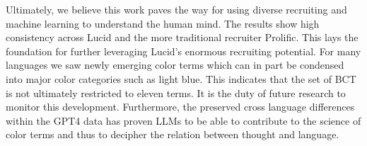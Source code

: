 Ultimately, we believe this work paves the way for using diverse recruiting and machine learning to understand the human mind.
The results show high consistency across Lucid and the more traditional recruiter Prolific.
This lays the foundation for further leveraging Lucid's enormous recruiting potential.
For many languages we saw newly emerging color terms which can in part be condensed into major color categories such as light blue.
This indicates that the set of BCT is not ultimately restricted to eleven terms.
It is the duty of future research to monitor this development.
Furthermore, the preserved cross language differences within the GPT4 data has proven LLMs to be able to contribute to the science of color terms and thus to decipher the relation between thought and language.
